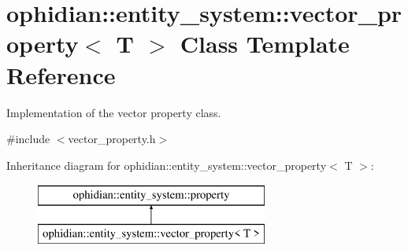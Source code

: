 \hypertarget{classophidian_1_1entity__system_1_1vector__property}{\section{ophidian\-:\-:entity\-\_\-system\-:\-:vector\-\_\-property$<$ T $>$ Class Template Reference}
\label{classophidian_1_1entity__system_1_1vector__property}
}


Implementation of the vector property class.  




{\ttfamily \#include $<$vector\-\_\-property.\-h$>$}

Inheritance diagram for ophidian\-:\-:entity\-\_\-system\-:\-:vector\-\_\-property$<$ T $>$\-:\begin{figure}[H]
\begin{center}
\leavevmode
\includegraphics[height=2.000000cm]{classophidian_1_1entity__system_1_1vector__property}
\end{center}
\end{figure}
